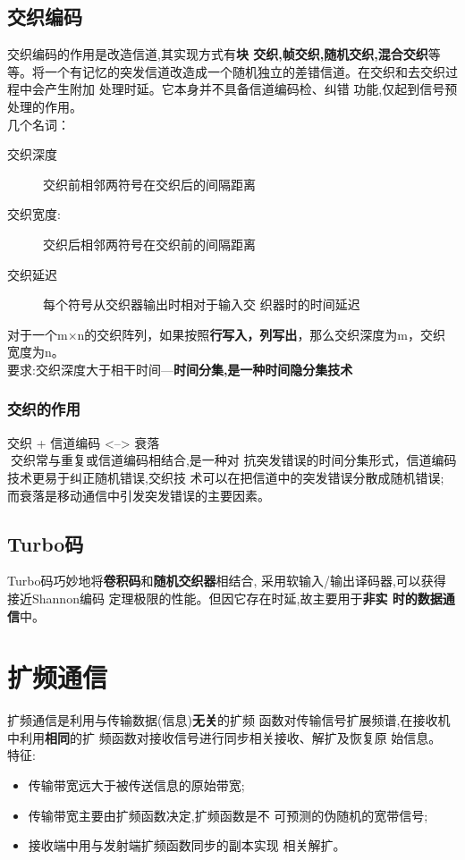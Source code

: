 \subsection{交织编码}
交织编码的作用是改造信道,其实现方式有\textbf{块
交织,帧交织,随机交织,混合交织}等等。将一个有记忆的突发信道改造成一个随机独立的差错信道。在交织和去交织过程中会产生附加
处理时延。它本身并不具备信道编码检、纠错
功能,仅起到信号预处理的作用。\\
几个名词：
\begin{description}
	\item[交织深度
	] 交织前相邻两符号在交织后的间隔距离
	\item[交织宽度:
	] 交织后相邻两符号在交织前的间隔距离
	\item [交织延迟
	]每个符号从交织器输出时相对于输入交
	织器时的时间延迟
	
\end{description}
对于一个m$\times$n的交织阵列，如果按照\textbf{行写入，列写出}，那么交织深度为m，交织宽度为n。\\
要求:交织深度大于相干时间---\textbf{时间分集,是一种时间隐分集技术}
\subsubsection{交织的作用}
交织 + 信道编码 <--> 衰落\\
\vspace{1cm}
交织常与重复或信道编码相结合,是一种对
抗突发错误的时间分集形式，信道编码技术更易于纠正随机错误,交织技
术可以在把信道中的突发错误分散成随机错误;
而衰落是移动通信中引发突发错误的主要因素。

\subsection{Turbo码}
Turbo码巧妙地将\textbf{卷积码}和\textbf{随机交织器}相结合,
采用软输入/输出译码器,可以获得接近Shannon编码
定理极限的性能。但因它存在时延,故主要用于\textbf{非实
时的数据通信}中。

\section{扩频通信}
扩频通信是利用与传输数据(信息)\textbf{无关}的扩频
函数对传输信号扩展频谱,在接收机中利用\textbf{相同}的扩
频函数对接收信号进行同步相关接收、解扩及恢复原
始信息。\\
特征:
\begin{itemize}
	\item 传输带宽远大于被传送信息的原始带宽;
	\item 传输带宽主要由扩频函数决定,扩频函数是不
	可预测的伪随机的宽带信号;
	\item 接收端中用与发射端扩频函数同步的副本实现
	相关解扩。
	
\end{itemize}
